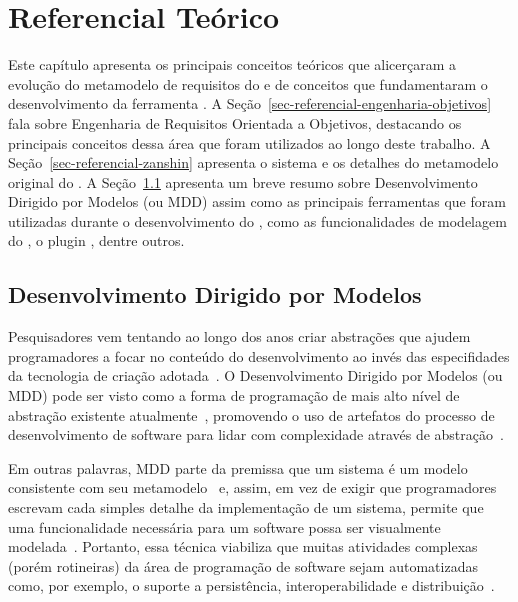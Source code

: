 \chapter{Referencial Teórico}
\label{sec-referencial}

Este capítulo apresenta os principais conceitos teóricos que alicerçaram a evolução do metamodelo de requisitos do \zanshin e de conceitos que fundamentaram o desenvolvimento da ferramenta \unagi. A Seção~\ref{sec-referencial-engenharia-objetivos} fala sobre Engenharia de Requisitos Orientada a Objetivos, destacando os principais conceitos dessa área que foram utilizados ao longo deste trabalho. A Seção~\ref{sec-referencial-zanshin} apresenta o sistema \zanshin e os detalhes do metamodelo original do \framework. A Seção~\ref{referencial-mdd} apresenta um breve resumo sobre Desenvolvimento Dirigido por Modelos (\mdd ou MDD) assim como  as principais ferramentas que foram utilizadas durante o desenvolvimento do \unagi, como as funcionalidades \emf de modelagem do \eclipse, o plugin \sirius, dentre outros.

\section{Desenvolvimento Dirigido por Modelos}
\label{referencial-mdd}
Pesquisadores vem tentando ao longo dos anos criar abstrações que ajudem programadores a focar no conteúdo do desenvolvimento ao invés das especifidades da tecnologia de criação adotada~\cite{viyovic2014sirius}. O Desenvolvimento Dirigido por Modelos (\mdd ou MDD) pode ser visto como a forma de programação de mais alto nível de abstração existente atualmente~\cite{atkinson2003model}, promovendo o uso de artefatos do processo de desenvolvimento de software para lidar com complexidade através de abstração~\cite{viyovic2014sirius}.

Em outras palavras, MDD parte da premissa que um sistema é um modelo consistente com seu metamodelo~\cite{vujovic2014comparative} e, assim, em vez de exigir que programadores escrevam cada simples detalhe da implementação de um sistema, permite que uma funcionalidade necessária para um software possa ser visualmente modelada~\cite{atkinson2003model}. Portanto, essa técnica viabiliza que muitas atividades complexas (porém rotineiras) da área de programação de software sejam automatizadas como, por exemplo, o suporte a persistência, interoperabilidade e distribuição~\cite{atkinson2003model}.

